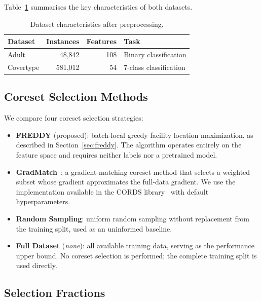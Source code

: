 \documentclass{article}
\begin{document}
Table~\ref{tab:datasets} summarises the key characteristics of both datasets.

\begin{table}[h!]
  \centering
  \caption{Dataset characteristics after preprocessing.}
  \label{tab:datasets}
  \begin{tabular}{lrrl}
    \toprule
    \textbf{Dataset} & \textbf{Instances} & \textbf{Features} & \textbf{Task} \\
    \midrule
    Adult     & 48,842  & 108 & Binary classification \\
    Covertype & 581,012 &  54 & 7-class classification \\
    \bottomrule
  \end{tabular}
\end{table}

\subsection{Coreset Selection Methods}

We compare four coreset selection strategies:

\begin{itemize}
  \item \textbf{FREDDY} (proposed): batch-local greedy facility location
        maximization, as described in Section~\ref{sec:freddy}.
        The algorithm operates entirely on the feature space and requires
        neither labels nor a pretrained model.

  \item \textbf{GradMatch}~\cite{killamsetty2021grad}: a gradient-matching
        coreset method that selects a weighted subset whose gradient approximates
        the full-data gradient.
        We use the implementation available in the CORDS
        library~\cite{killamsetty2022cords} with default hyperparameters.

  \item \textbf{Random Sampling}: uniform random sampling without replacement
        from the training split, used as an uninformed baseline.

  \item \textbf{Full Dataset} (\textit{none}): all available training data,
        serving as the performance upper bound.
        No coreset selection is performed; the complete training split is used
        directly.
\end{itemize}

\subsection{Selection Fractions}
\end{document}
